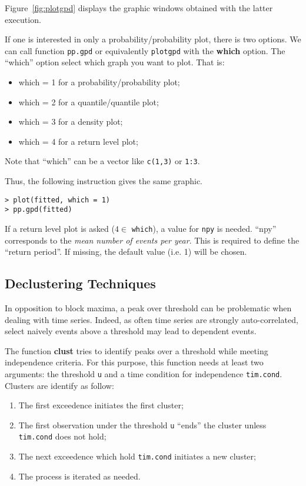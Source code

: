 \documentclass[11pt,a4paper]{article}
\numberwithin{equation}{section}
\theoremstyle{definition}
\begin{document}
Figure~\ref{fig:plotgpd} displays the graphic windows obtained with
the latter execution.

If one is interested in only a probability/probability plot, there is
two options. We can call function \verb|pp.gpd| or equivalently
\verb|plotgpd| with the \textbf{which} option. The ``which'' option
select which graph you want to plot. That is:
\begin{itemize}
\item{which = 1} for a probability/probability plot;
\item{which = 2} for a quantile/quantile plot;
\item{which = 3} for a density plot;
\item{which = 4} for a return level plot;
\end{itemize}
Note that ``which'' can be a vector like \verb|c(1,3)| or \verb|1:3|.

Thus, the following instruction gives the same graphic.
\begin{verbatim}
> plot(fitted, which = 1)
> pp.gpd(fitted)
\end{verbatim}

If a return level plot is asked ($4 \in$ \verb|which|), a value for
\verb|npy| is needed. ``npy'' corresponds to the \emph{mean number of
  events per year}. This is required to define the ``return
period''. If missing, the default value (i.e. 1) will be chosen.

\subsection{Declustering Techniques}
\label{subsec:declust}

In opposition to block maxima, a peak over threshold can be
problematic when dealing with time series. Indeed, as often time
series are strongly auto-correlated, select naively events above a
threshold may lead to dependent events.

The function \textbf{clust} tries to identify peaks over a threshold
while meeting independence criteria. For this purpose, this function
needs at least two arguments: the threshold \verb|u| and a time
condition for independence \verb|tim.cond|. Clusters are identify as
follow:
\begin{enumerate}
\item The first exceedence initiates the first cluster;
\item The first observation under the threshold \verb|u| ``ends'' the
  cluster unless \verb|tim.cond| does not hold;
\item The next exceedence which hold \verb|tim.cond| initiates a new
  cluster;
\item The process is iterated as needed.
\end{enumerate}
\end{document}
